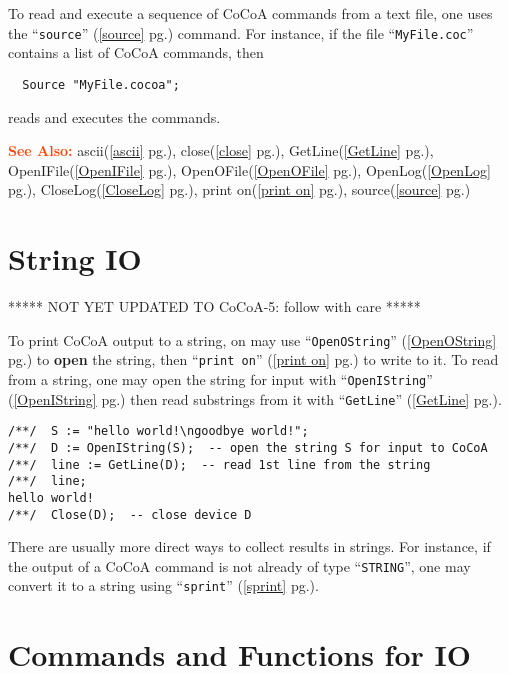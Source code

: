 \documentclass[a4paper]{mybook}
\newcommand\SeeAlso{\par\textcolor{OrangeRed}{\textbf{\large See Also: }}}
\begin{document}
To read and execute a sequence of CoCoA commands from a text file, one
uses the ``\verb&source&'' (\ref{source} pg.\pageref{source}) command.  For instance, if the
file ``\verb&MyFile.coc&'' contains a list of CoCoA commands, then
\begin{verbatim}
  Source "MyFile.cocoa";
\end{verbatim}
reads and executes the commands.

\SeeAlso %
  ascii(\ref{ascii} pg.\pageref{ascii}), 
    close(\ref{close} pg.\pageref{close}), 
    GetLine(\ref{GetLine} pg.\pageref{GetLine}), 
    OpenIFile(\ref{OpenIFile} pg.\pageref{OpenIFile}), 
    OpenOFile(\ref{OpenOFile} pg.\pageref{OpenOFile}), 
    OpenLog(\ref{OpenLog} pg.\pageref{OpenLog}), 
    CloseLog(\ref{CloseLog} pg.\pageref{CloseLog}), 
    print on(\ref{print on} pg.\pageref{print on}), 
    source(\ref{source} pg.\pageref{source})

\section{String IO}
\label{String IO}

        
***** NOT YET UPDATED TO CoCoA-5: follow with care *****
\par 
To print CoCoA output to a string, on may use ``\verb&OpenOString&'' (\ref{OpenOString} pg.\pageref{OpenOString}) to
\textbf{open} the string, then ``\verb&print on&'' (\ref{print on} pg.\pageref{print on}) to write to it.  To read from a
string, one may open the string for input with ``\verb&OpenIString&'' (\ref{OpenIString} pg.\pageref{OpenIString}) then read
substrings from it with ``\verb&GetLine&'' (\ref{GetLine} pg.\pageref{GetLine}).
\begin{Verbatim}[label=example, rulecolor=\color{PineGreen}, frame=single]
/**/  S := "hello world!\ngoodbye world!";
/**/  D := OpenIString(S);  -- open the string S for input to CoCoA
/**/  line := GetLine(D);  -- read 1st line from the string
/**/  line;
hello world!
/**/  Close(D);  -- close device D
\end{Verbatim}

There are usually more direct ways to collect results in strings.  For
instance, if the output of a CoCoA command is not already of type
``\verb&STRING&'', one may convert it to a string using ``\verb&sprint&'' (\ref{sprint} pg.\pageref{sprint}).


\section{Commands and Functions for IO}
\label{Commands and Functions for IO}
\end{document}

